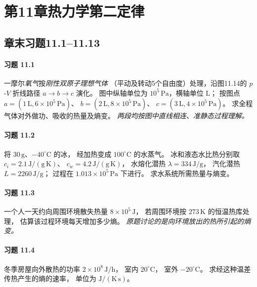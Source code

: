 \section*{第11章\quad 热力学第二定律}
\subsection*{章末习题11.1--11.13}

\paragraph{习题 11.1}
一摩尔\emph{氧气}按\emph{刚性双原子理想气体}
（平动及转动5个自由度）处理，沿图11.14的
\(p\)-\(V\) 折线路径 \(a\to b\to c\) 演化。
图中纵轴单位为 \(10^5\,\mathrm{Pa}\)，横轴单位 \(\mathrm L\)；
按图点 \(a=(1\,\mathrm L,6\times10^5\,\mathrm{Pa})\)、
\(b=(2\,\mathrm L,8\times10^5\,\mathrm{Pa})\)、
\(c=(3\,\mathrm L,4\times10^5\,\mathrm{Pa})\)。
求全程气体对外做功、吸收的热量及熵变。
\textit{两段均按图中直线相连、准静态过程理解。}

\paragraph{习题 11.2}
将 \(30\,\mathrm g\)、\(-40^\circ\mathrm C\) 的冰，
经加热变成 \(100^\circ\mathrm C\) 的水蒸气。
冰和液态水比热分别取
\(c_i=2.1\,\mathrm{J/(g\,K)}\)、
\(c_w=4.2\,\mathrm{J/(g\,K)}\)，
水熔化潜热
\(\lambda=334\,\mathrm{J/g}\)，
汽化潜热 \(L=2260\,\mathrm{J/g}\)；
过程在 \(1.013\times10^5\,\mathrm{Pa}\) 下进行。
求水系统所需热量与熵变。

\paragraph{习题 11.3}
一个人一天约向周围环境散失热量
\(8\times10^5\,\mathrm J\)，
若周围环境按 \(273\,\mathrm K\) 的恒温热库处理，
估算该过程环境每天增加多少熵。
\textit{原题讨论的是向环境放出的热所引起的熵变。}

\paragraph{习题 11.4}
冬季房屋向外散热的功率
\(2\times10^8\,\mathrm{J/h}\)，
室内 \(20^\circ\mathrm C\)，
室外 \(-20^\circ\mathrm C\)。
求经这种温差传热产生的熵的速率，
单位为 \(\mathrm{J/(K\,s)}\)。

